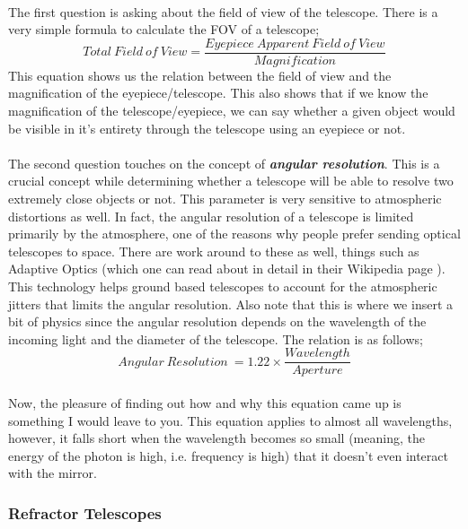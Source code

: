 \documentclass[a4paper,twoside]{article}
\numberwithin{equation}{section}
\begin{document}
\paragraph{}
The first question is asking about the field of view of the telescope. There is a very simple formula to calculate the FOV of a telescope;
\begin{equation}
Total \ Field \ of \ View = \frac{Eyepiece \ Apparent \ Field \ of \ View}{Magnification}
\end{equation}
This equation shows us the relation between the field of view and the magnification of the eyepiece/telescope. This also shows that if we know the magnification of the telescope/eyepiece, we can say whether a given object would be visible in it's entirety through the telescope using an eyepiece or not.
\paragraph{}
The second question touches on the concept of \textit{\textbf{angular resolution}}. This is a crucial concept while determining whether a telescope will be able to resolve two extremely close objects or not. This parameter is very sensitive to atmospheric distortions as well. In fact, the angular resolution of a telescope is limited primarily by the atmosphere, one of the reasons why people prefer sending optical telescopes to space. There are work around to these as well, things such as Adaptive Optics (which one can read about in detail in their Wikipedia page \cite{AO1}). This technology helps ground based telescopes to account for the atmospheric jitters that limits the angular resolution. Also note that this is where we insert a bit of physics since the angular resolution depends on the wavelength of the incoming light and the diameter of the telescope. The relation is as follows;
\begin{equation}
Angular \ Resolution \ = 1.22 \times \frac{Wavelength}{Aperture}
\end{equation}
\paragraph{}
Now, the pleasure of finding out how and why this equation came up is something I would leave to you. This equation applies to almost all wavelengths, however, it falls short when the wavelength becomes so small (meaning, the energy of the photon is high, i.e. frequency is high) that it doesn't even interact with the mirror. 
\subsubsection{Refractor Telescopes}
\end{document}

